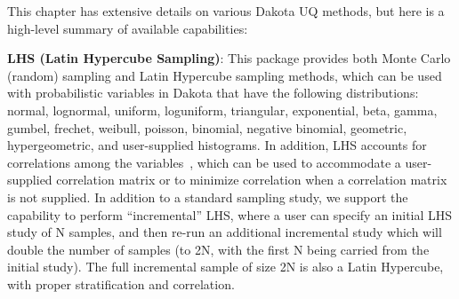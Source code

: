 
This chapter has extensive details on various Dakota UQ methods, but here is a
high-level summary of available capabilities:


\textbf{LHS (Latin Hypercube Sampling)}: This package provides both
Monte Carlo (random) sampling and Latin Hypercube sampling methods,
which can be used with probabilistic variables in Dakota that have the
following distributions: normal, lognormal, uniform, loguniform,
triangular, exponential, beta, gamma, gumbel, frechet, weibull, poisson, 
binomial, negative binomial, geometric, hypergeometric, and
user-supplied histograms. In addition, LHS accounts for correlations
among the variables~\cite{Ima84}, which can be used to accommodate a
user-supplied correlation matrix or to minimize correlation when a
correlation matrix is not supplied. 
In addition to a standard sampling study, we support the capability to perform 
``incremental'' LHS, where a user can specify an initial LHS study 
of N samples, and then re-run an additional incremental study which 
will double the number of samples (to 2N, with the first N being 
carried from the initial study). The full incremental sample of 
size 2N is also a Latin Hypercube, with proper stratification and 
correlation. 

